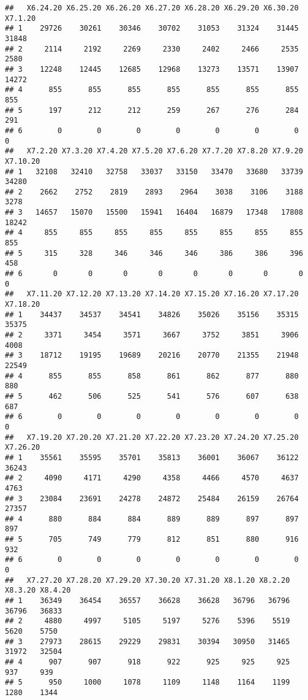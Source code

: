 \documentclass[
]{article}
\begin{document}
\begin{verbatim}
##   X6.24.20 X6.25.20 X6.26.20 X6.27.20 X6.28.20 X6.29.20 X6.30.20 X7.1.20
## 1    29726    30261    30346    30702    31053    31324    31445   31848
## 2     2114     2192     2269     2330     2402     2466     2535    2580
## 3    12248    12445    12685    12968    13273    13571    13907   14272
## 4      855      855      855      855      855      855      855     855
## 5      197      212      212      259      267      276      284     291
## 6        0        0        0        0        0        0        0       0
##   X7.2.20 X7.3.20 X7.4.20 X7.5.20 X7.6.20 X7.7.20 X7.8.20 X7.9.20 X7.10.20
## 1   32108   32410   32758   33037   33150   33470   33680   33739    34280
## 2    2662    2752    2819    2893    2964    3038    3106    3188     3278
## 3   14657   15070   15500   15941   16404   16879   17348   17808    18242
## 4     855     855     855     855     855     855     855     855      855
## 5     315     328     346     346     346     386     386     396      458
## 6       0       0       0       0       0       0       0       0        0
##   X7.11.20 X7.12.20 X7.13.20 X7.14.20 X7.15.20 X7.16.20 X7.17.20 X7.18.20
## 1    34437    34537    34541    34826    35026    35156    35315    35375
## 2     3371     3454     3571     3667     3752     3851     3906     4008
## 3    18712    19195    19689    20216    20770    21355    21948    22549
## 4      855      855      858      861      862      877      880      880
## 5      462      506      525      541      576      607      638      687
## 6        0        0        0        0        0        0        0        0
##   X7.19.20 X7.20.20 X7.21.20 X7.22.20 X7.23.20 X7.24.20 X7.25.20 X7.26.20
## 1    35561    35595    35701    35813    36001    36067    36122    36243
## 2     4090     4171     4290     4358     4466     4570     4637     4763
## 3    23084    23691    24278    24872    25484    26159    26764    27357
## 4      880      884      884      889      889      897      897      897
## 5      705      749      779      812      851      880      916      932
## 6        0        0        0        0        0        0        0        0
##   X7.27.20 X7.28.20 X7.29.20 X7.30.20 X7.31.20 X8.1.20 X8.2.20 X8.3.20 X8.4.20
## 1    36349    36454    36557    36628    36628   36796   36796   36796   36833
## 2     4880     4997     5105     5197     5276    5396    5519    5620    5750
## 3    27973    28615    29229    29831    30394   30950   31465   31972   32504
## 4      907      907      918      922      925     925     925     937     939
## 5      950     1000     1078     1109     1148    1164    1199    1280    1344

\end{verbatim}
\end{document}
